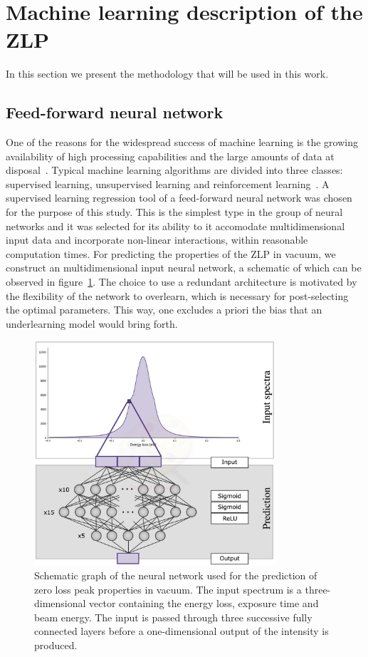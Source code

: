 \section{Machine learning description of the ZLP}
\label{sec:methodology}

In this section we present the methodology that will be
used in this work.

\subsection{Feed-forward neural network}

One of the reasons for the widespread success of machine learning 
is the growing availability of high processing capabilities 
and the large amounts of data at disposal~\cite{LeCun:2015}.
%
Typical machine learning algorithms are divided into three classes:
supervised learning, unsupervised learning and reinforcement learning~\cite{Kotsiantis:2007}.
%
A supervised learning regression tool of a feed-forward neural network 
was chosen for the purpose of this study. This is the simplest type 
in the group of neural networks and it was selected for its ability
to it accomodate multidimensional input data and 
incorporate non-linear interactions, within reasonable computation times. 
%
For predicting the properties of the ZLP in vacuum, we construct an multidimensional
input neural network, a schematic of which can be observed in figure~\ref{fig:architecture}.
%
The choice to use a redundant architecture is motivated by the flexibility of the network 
to overlearn, which is necessary for post-selecting the optimal parameters.
This way, one excludes a priori the bias that an underlearning model would bring forth. 

\begin{figure}[h]
    \centering
    \includegraphics[width=90mm]{plots/architecture.jpg}
    \caption{Schematic graph of the neural network used for the prediction of zero loss peak properties in vacuum. The input spectrum is a three-dimensional vector containing the energy loss, exposure time and beam energy. The input is passed through three successive fully connected layers before a one-dimensional output of the intensity is produced.}
    \label{fig:architecture}
\end{figure}

